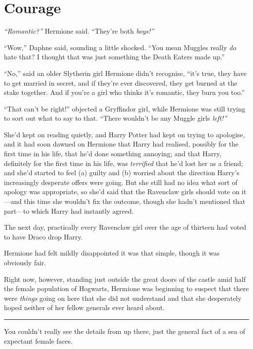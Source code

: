 \chapter{Courage}

\emph{``Romantic?''} Hermione said. ``They're both \emph{boys!''}

``Wow,'' Daphne said, sounding a little shocked. ``You mean Muggles
really \emph{do} hate that? I thought that was just something the Death
Eaters made up.''

``No,'' said an older Slytherin girl Hermione didn't recognise, ``it's
true, they have to get married in secret, and if they're ever
discovered, they get burned at the stake together. And if you're a girl
who thinks it's romantic, they burn you too.''

``That can't be right!'' objected a Gryffindor girl, while Hermione was
still trying to sort out what to say to that. ``There wouldn't be any
Muggle girls \emph{left!''}

She'd kept on reading quietly, and Harry Potter had kept on trying to
apologise, and it had soon dawned on Hermione that Harry had realised,
possibly for the first time in his life, that he'd done something
annoying; and that Harry, definitely for the first time in his life, was
\emph{terrified} that he'd lost her as a friend; and she'd started to
feel (a) guilty and (b) worried about the direction Harry's increasingly
desperate offers were going. But she still had no idea what sort of
apology was appropriate, so she'd said that the Ravenclaw girls should
vote on it---and this time she wouldn't fix the outcome, though she
hadn't mentioned that part---to which Harry had instantly agreed.

The next day, practically every Ravenclaw girl over the age of thirteen
had voted to have Draco drop Harry.

Hermione had felt mildly disappointed it was that simple, though it was
obviously fair.

Right now, however, standing just outside the great doors of the castle
amid half the female population of Hogwarts, Hermione was beginning to
suspect that there were \emph{things} going on here that she did not
understand and that she desperately hoped neither of her fellow generals
ever heard about.

\begin{center}\rule{3in}{0.4pt}\end{center}

You couldn't really see the details from up there, just the general fact
of a sea of expectant female faces.

